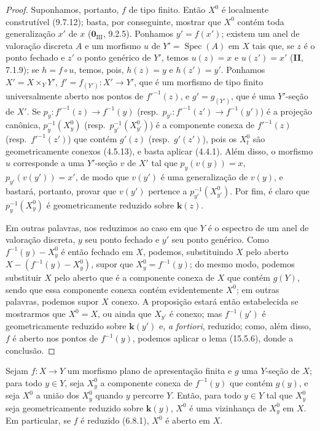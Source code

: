 \begin{proof}
Suponhamos, portanto, $f$ de tipo finito. Então $X^0$ é localmente construtível (9.7.12); basta, por conseguinte, mostrar que $X^0$ contém toda generalização $x'$ de $x$ ($\mathbf{0}_{\mathrm{III}}$, 9.2.5). Ponhamos $y'=f(x')$; existem um anel de valoração discreta $A$ e um morfismo $u$ de $Y'=\operatorname{Spec}(A)$ em $X$ tais que, se $z$ é o ponto fechado e $z'$ o ponto genérico de $Y'$, temos $u(z)=x$ e $u(z')=x'$ (\textbf{II}, 7.1.9); se $h=f\circ u$, temos, pois, $h(z)=y$ e $h(z')=y'$. Ponhamos $X'=X\times_Y Y'$, $f'=f_{(Y')}:X'\to Y'$, que é um morfismo de tipo finito universalmente aberto nos pontos de $f'^{-1}(z)$, e $g'=g_{(Y')}$, que é uma $Y'$-seção de $X'$. Se $p_y:f'^{-1}(z)\to f^{-1}(y)$ (resp.\ $p_{y'}:f'^{-1}(z')\to f^{-1}(y')$) é a projeção canônica, $p_y^{-1}(X_y^0)$ (resp.\ $p_{y'}^{-1}(X_{y'}^0)$) é a componente conexa de $f'^{-1}(z)$ (resp.\ $f'^{-1}(z')$) que contém $g'(z)$ (resp.\ $g'(z')$), pois os $X_t^0$ são geometricamente conexos (4.5.13), e basta aplicar (4.4.1). Além disso, o morfismo $u$ corresponde a uma $Y'$-seção $v$ de $X'$ tal que $p_y(v(y))=x$, $p_{y'}(v(y'))=x'$, de modo que $v(y')$ é uma generalização de $v(y)$, e bastará, portanto, provar que $v(y')$ pertence a $p_{y'}^{-1}(X_{y'}^0)$. Por fim, é claro que $p_y^{-1}(X_y^0)$ é geometricamente reduzido sobre $\mathbf{k}(z)$.

Em outras palavras, nos reduzimos ao caso em que $Y$ é o espectro de um anel de valoração discreta, $y$ seu ponto fechado e $y'$ seu ponto genérico. Como $f^{-1}(y)-X_y^0$ é então fechado em $X$, podemos, substituindo $X$ pelo aberto $X-(f^{-1}(y)-X_y^0)$, supor que $X_y^0=f^{-1}(y)$; do mesmo modo, podemos substituir $X$ pelo aberto que é a componente conexa de $X$ que contém $g(Y)$, sendo que essa componente conexa contém evidentemente $X^0$; em outras palavras, podemos supor $X$ conexo. A proposição estará então estabelecida se mostrarmos que $X^0=X$, ou ainda que $X_{y'}$ é conexo; mas $f^{-1}(y')$ é geometricamente reduzido sobre $\mathbf{k}(y')$ e, \emph{a fortiori}, reduzido; como, além disso, $f$ é aberto nos pontos de $f^{-1}(y)$, podemos aplicar o lema (15.5.6), donde a conclusão.
\end{proof}

\begin{corollary}[15.6.5]
\label{IV.15.6.5}
Sejam $f:X\to Y$ um morfismo plano de apresentação finita e $g$ uma $Y$-seção de $X$; para todo $y\in Y$, seja $X_y^0$ a componente conexa de $f^{-1}(y)$ que contém $g(y)$, e seja $X^0$ a união dos $X_y^0$ quando $y$ percorre $Y$. Então, para todo $y\in Y$ tal que $X_y^0$ seja geometricamente reduzido sobre $\mathbf{k}(y)$, $X^0$ é uma vizinhança de $X_y^0$ em $X$. Em particular, se $f$ é reduzido (6.8.1), $X^0$ é aberto em $X$.
\end{corollary}

